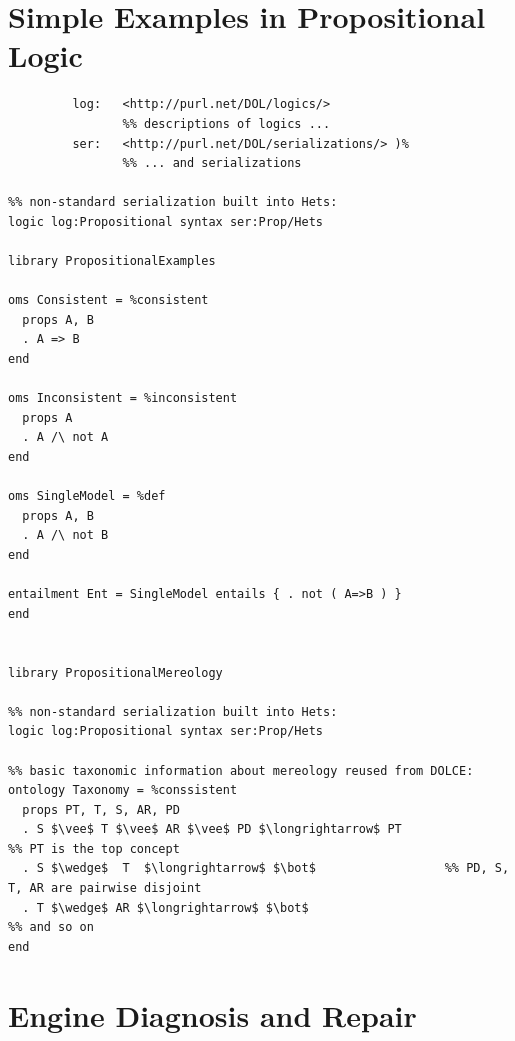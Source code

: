 \documentclass[10pt,fleqn,final]{scrreprt}
\newcommand{\sclause}[1]{\section{#1}}
\begin{document}
\sclause{Simple Examples in Propositional Logic}
\begin{lstlisting}[basicstyle=\ttfamily,language=dolText,morekeywords={props,ObjectProperty,Class,DisjointUnionOf,SubClassOf,Characteristics,Transitive,Asymmetric,SubPropertyOf,DisjointClasses,EquivalentTo,inverse,only,forall,iff,if,or,exists},escapechar=@,mathescape]
%prefix( :      <http://www.example.org/prop#>
         log:   <http://purl.net/DOL/logics/>
                %% descriptions of logics ...
         ser:   <http://purl.net/DOL/serializations/> )%
                %% ... and serializations

%% non-standard serialization built into Hets: 
logic log:Propositional syntax ser:Prop/Hets       

library PropositionalExamples

oms Consistent = %consistent
  props A, B
  . A => B
end

oms Inconsistent = %inconsistent
  props A
  . A /\ not A
end

oms SingleModel = %def
  props A, B
  . A /\ not B
end

entailment Ent = SingleModel entails { . not ( A=>B ) }
end


library PropositionalMereology

%% non-standard serialization built into Hets: 
logic log:Propositional syntax ser:Prop/Hets       

%% basic taxonomic information about mereology reused from DOLCE:
ontology Taxonomy = %conssistent      
  props PT, T, S, AR, PD
  . S $\vee$ T $\vee$ AR $\vee$ PD $\longrightarrow$ PT                                                    %% PT is the top concept
  . S $\wedge$  T  $\longrightarrow$ $\bot$                  %% PD, S, T, AR are pairwise disjoint
  . T $\wedge$ AR $\longrightarrow$ $\bot$                                                                         %% and so on
end
\end{lstlisting}

\sclause{Engine Diagnosis and Repair}\label{engine}
\end{document}
